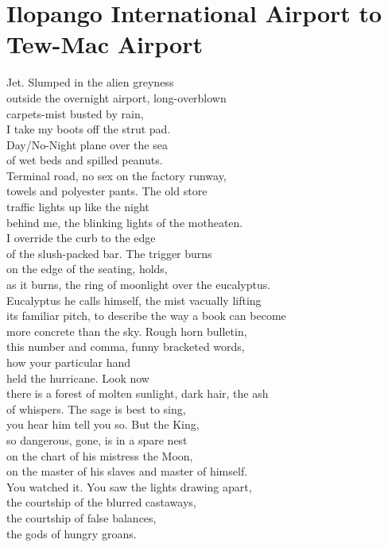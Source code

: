 \documentclass[smalldemyvopaper,11pt,twoside,onecolumn,openright,extrafontsizes]{memoir}
\begin{document}
\chapter{Ilopango International Airport to Tew-Mac Airport}
Jet. Slumped in the alien greyness
\\outside the overnight airport, long-overblown
\\carpets-mist busted by rain,
\\I take my boots off the strut pad.
\\Day/No-Night plane over the sea
\\of wet beds and spilled peanuts.
\\Terminal road, no sex on the factory runway,
\\towels and polyester pants. The old store
\\traffic lights up like the night
\\behind me, the blinking lights of the motheaten.
\\I override the curb to the edge
\\of the slush-packed bar. The trigger burns
\\on the edge of the seating, holds,
\\as it burns, the ring of moonlight over the eucalyptus.
\\Eucalyptus he calls himself, the mist vacually lifting
\\its familiar pitch, to describe the way a book can become
\\more concrete than the sky. Rough horn bulletin,
\\this number and comma, funny bracketed words,
\\how your particular hand
\\held the hurricane. Look now
\\there is a forest of molten sunlight, dark hair, the ash
\\of whispers. The sage is best to sing,
\\you hear him tell you so. But the King,
\\so dangerous, gone, is in a spare nest
\\on the chart of his mistress the Moon,
\\on the master of his slaves and master of himself.
\\You watched it. You saw the lights drawing apart,
\\the courtship of the blurred castaways,
\\the courtship of false balances,
\\the gods of hungry groans.
\end{document}

